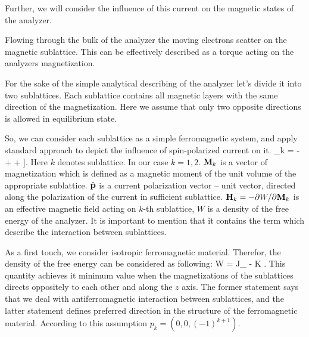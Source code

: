 Further, we will consider the influence of this current on the magnetic states of the analyzer.

Flowing through the bulk of the analyzer the moving electrons scatter on the magnetic sublattice. This can be effectively described as a torque acting on the analyzers magnetization.

For the sake of the simple analytical describing of the analyzer let's divide it into two sublattices. Each sublattice contains all magnetic layers with the same direction of the magnetization. Here we assume that only two opposite directions is allowed in equilibrium state.

So, we can consider each sublattice as a simple ferromagnetic system, and apply standard approach to depict the influence of spin-polarized current on it.
\be
	\label{eq:LLGS}
	_k =
			- \gamma {}
			+ 
			+ 
				\left[
					\mb{M}_k \times \left[ \mb{M}_k \times \uv{p}_k \right]
				\right].
\ee
Here $k$ denotes sublattice. In our case $k = 1, 2$. $\mathbf{ {M} }_k$ is a vector of magnetization which is defined as a magnetic moment of the unit volume of the appropriate sublattice. $\hat{\mathbf{ { p } }}$ is a current polarization vector -- unit vector, directed along the polarization of the current in sufficient sublattice. $\mathbf{ {H} }_k = -\partial W / \partial \mathbf{ {M} }_k$ is an effective magnetic field acting on $k$-th sublattice, $W$ is a density of the free energy of the analyzer. It is important to mention that it contains the term which describe the interaction between sublattices.

As a first touch, we consider isotropic ferromagnetic material. Therefor, the density of the free energy can be considered as following:
\be
	\label{eq:free_enegy}
	W = J_ 
		-  K .
\ee
This quantity achieves it minimum value when the magnetizations of the sublattices directs oppositely to each other and along the $z$ axis. The former statement says that we deal with antiferromagnetic interaction between sublattices, and the latter statement defines preferred direction in the structure of the ferromagnetic material. According to this assumption $p_k = (0, 0, (-1)^{k+1})$.

